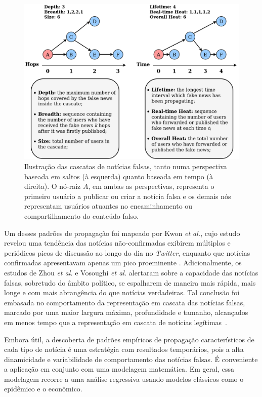 \documentclass{SBCbookchapter}
\begin{document}
\begin{figure}[tb!]
	\centering
	\includegraphics[width=1\columnwidth]{cascata_hop_time.png}
	\vspace{2mm}
	\caption{Ilustração das cascatas de notícias falsas, tanto numa perspectiva baseada em saltos (à esquerda) quanto baseada em tempo (à direita). O nó-raiz $A$, em ambas as perspectivas, representa o primeiro usuário a publicar ou criar a notícia falsa e os demais nós representam usuários atuantes no encaminhamento ou compartilhamento do conteúdo falso.}
	\label{fig:cascata}
    \vspace{-8mm}	
\end{figure}

Um desses padrões de propagação foi mapeado por Kwon \textit{et al.}, cujo estudo revelou uma tendência das notícias não-confirmadas exibirem múltiplos e periódicos picos de discussão ao longo do dia no \textit{Twitter}, enquanto que notícias confirmadas apresentavam apenas um pico proeminente \cite{kwon2013prominent}. Adicionalmente, os estudos de Zhou \textit{et al.} e Vosoughi \textit{et al.} alertaram sobre a capacidade das notícias falsas, sobretudo do âmbito político, se espalharem de maneira mais rápida, mais longe e com mais abrangência do que notícias verdadeiras. Tal conclusão foi embasada no comportamento da representação em cascata das notícias falsas, marcado por uma maior largura máxima, profundidade e tamanho, alcançados em menos tempo que a representação em cascata de notícias legítimas~\cite{zhou2015real,science-spread-fakenews}. 

Embora útil, a descoberta de padrões empíricos de propagação característicos de cada tipo de notícia é uma estratégia com resultados temporários, pois a alta dinamicidade e variabilidade de comportamento das notícias falsas. É conveniente a aplicação em conjunto com uma modelagem matemática. Em geral, essa modelagem recorre a uma análise regressiva usando modelos clássicos como o epidêmico e o econômico.
\end{document}
